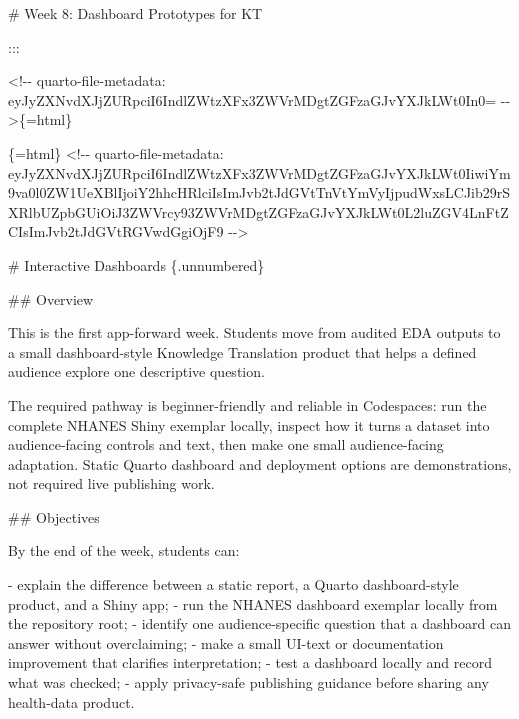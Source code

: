 \documentclass[
  letterpaper,
  DIV=11,
  numbers=noendperiod,
  oneside]{scrreprt}
\newenvironment{Shaded}{\begin{snugshade}}{\end{snugshade}}
\newcommand{\FunctionTok}[1]{\textcolor[rgb]{0.28,0.35,0.67}{#1}}
\newcommand{\InformationTok}[1]{\textcolor[rgb]{0.37,0.37,0.37}{#1}}
\newcommand{\NormalTok}[1]{\textcolor[rgb]{0.00,0.23,0.31}{#1}}
\newcommand{\SpecialStringTok}[1]{\textcolor[rgb]{0.13,0.47,0.30}{#1}}
\begin{document}
\begin{Shaded}
\begin{Highlighting}[numbers=left,,]
\FunctionTok{\# Week 8: Dashboard Prototypes for KT}


\NormalTok{:::}



\InformationTok{\textasciigrave{}\textless{}!{-}{-} quarto{-}file{-}metadata: eyJyZXNvdXJjZURpciI6IndlZWtzXFx3ZWVrMDgtZGFzaGJvYXJkLWt0In0= {-}{-}\textgreater{}\textasciigrave{}}\NormalTok{\{=html\}}

\InformationTok{\textasciigrave{}\textasciigrave{}\textasciigrave{}\{=html\}}
\InformationTok{\textless{}!{-}{-} quarto{-}file{-}metadata: eyJyZXNvdXJjZURpciI6IndlZWtzXFx3ZWVrMDgtZGFzaGJvYXJkLWt0IiwiYm9va0l0ZW1UeXBlIjoiY2hhcHRlciIsImJvb2tJdGVtTnVtYmVyIjpudWxsLCJib29rSXRlbUZpbGUiOiJ3ZWVrcy93ZWVrMDgtZGFzaGJvYXJkLWt0L2luZGV4LnFtZCIsImJvb2tJdGVtRGVwdGgiOjF9 {-}{-}\textgreater{}}
\InformationTok{\textasciigrave{}\textasciigrave{}\textasciigrave{}}

\FunctionTok{\# Interactive Dashboards \{.unnumbered\}}


\FunctionTok{\#\# Overview}

\NormalTok{This is the first app{-}forward week. Students move from audited EDA outputs to a small dashboard{-}style Knowledge Translation product that helps a defined audience explore one descriptive question.}

\NormalTok{The required pathway is beginner{-}friendly and reliable in Codespaces: run the complete NHANES Shiny exemplar locally, inspect how it turns a dataset into audience{-}facing controls and text, then make one small audience{-}facing adaptation. Static Quarto dashboard and deployment options are demonstrations, not required live publishing work.}

\FunctionTok{\#\# Objectives}

\NormalTok{By the end of the week, students can:}

\SpecialStringTok{{-} }\NormalTok{explain the difference between a static report, a Quarto dashboard{-}style product, and a Shiny app;}
\SpecialStringTok{{-} }\NormalTok{run the NHANES dashboard exemplar locally from the repository root;}
\SpecialStringTok{{-} }\NormalTok{identify one audience{-}specific question that a dashboard can answer without overclaiming;}
\SpecialStringTok{{-} }\NormalTok{make a small UI{-}text or documentation improvement that clarifies interpretation;}
\SpecialStringTok{{-} }\NormalTok{test a dashboard locally and record what was checked;}
\SpecialStringTok{{-} }\NormalTok{apply privacy{-}safe publishing guidance before sharing any health{-}data product.}


\end{Highlighting}
\end{Shaded}
\end{document}
